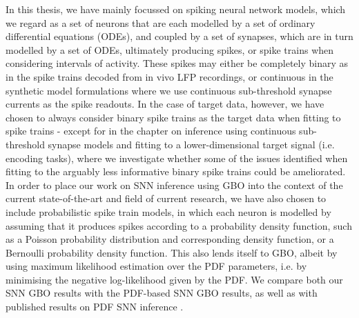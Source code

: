 \documentclass[mphil,deptreport,ianc]{infthesis} %
\begin{document}
In this thesis, we have mainly focussed on spiking neural network models, which we regard as a set of neurons that are each modelled by a set of ordinary differential equations (ODEs), and coupled by a set of synapses, which are in turn modelled by a set of ODEs, ultimately producing spikes, or spike trains when considering intervals of activity. 
These spikes may either be completely binary as in the spike trains decoded from in vivo LFP recordings, or continuous in the synthetic model formulations where we use continuous sub-threshold synapse currents as the spike readouts.
In the case of target data, however, we have chosen to always consider binary spike trains as the target data when fitting to spike trains - except for in the chapter on inference using continuous sub-threshold synapse models and fitting to a lower-dimensional target signal (i.e. encoding tasks), where we investigate whether some of the issues identified when fitting to the arguably less informative binary spike trains could be ameliorated.
In order to place our work on SNN inference using GBO into the context of the current state-of-the-art and field of current research, we have also chosen to include probabilistic spike train models, in which each neuron is modelled by assuming that it produces spikes according to a probability density function, such as a Poisson probability distribution and corresponding density function, or a Bernoulli probability density function.
This also lends itself to GBO, albeit by using maximum likelihood estimation over the PDF parameters, i.e. by minimising the negative log-likelihood given by the PDF.
We compare both our SNN GBO results with the PDF-based SNN GBO results, as well as with published results on PDF SNN inference \cite{Rene2020}.
\end{document}
